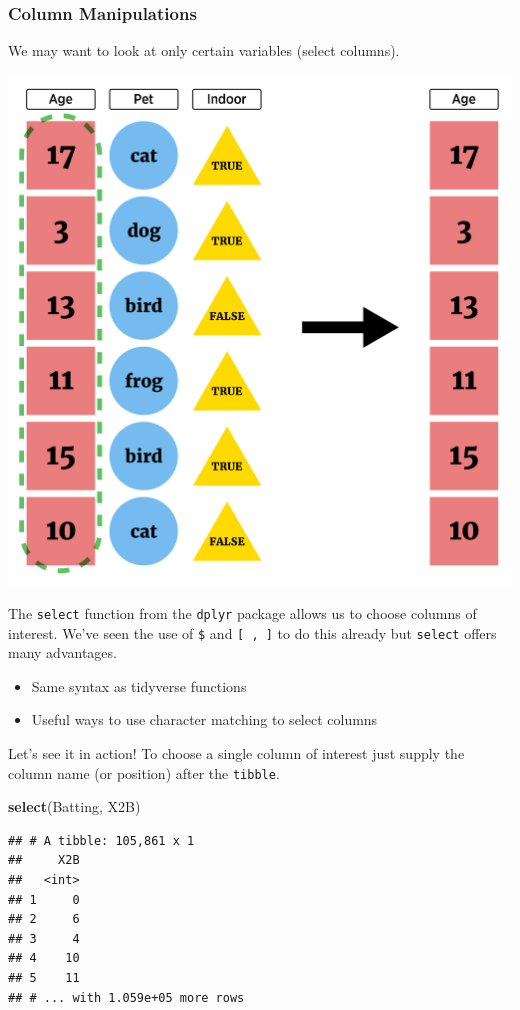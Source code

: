 \documentclass[
]{book}
\newenvironment{Shaded}{\begin{snugshade}}{\end{snugshade}}
\newcommand{\KeywordTok}[1]{\textcolor[rgb]{0.13,0.29,0.53}{\textbf{#1}}}
\newcommand{\NormalTok}[1]{#1}
\theoremstyle{definition}
\theoremstyle{definition}
\theoremstyle{definition}
\theoremstyle{remark}
\begin{document}
\hypertarget{column-manipulations-1}{%
\subsubsection{Column Manipulations}\label{column-manipulations-1}}

We may want to look at only certain variables (select columns).

\begin{center}\includegraphics[width=0.65\linewidth]{img/selectVisualF} \end{center}

The \texttt{select} function from the \texttt{dplyr} package allows us to choose columns of interest. We've seen the use of \texttt{\$} and \texttt{{[}\ ,\ {]}} to do this already but \texttt{select} offers many advantages.

\begin{itemize}
\item
  Same syntax as tidyverse functions
\item
  Useful ways to use character matching to select columns
\end{itemize}

Let's see it in action! To choose a single column of interest just supply the column name (or position) after the \texttt{tibble}.

\begin{Shaded}
\begin{Highlighting}[]
\KeywordTok{select}\NormalTok{(Batting, X2B)}
\end{Highlighting}
\end{Shaded}

\begin{verbatim}
## # A tibble: 105,861 x 1
##     X2B
##   <int>
## 1     0
## 2     6
## 3     4
## 4    10
## 5    11
## # ... with 1.059e+05 more rows
\end{verbatim}
\end{document}
